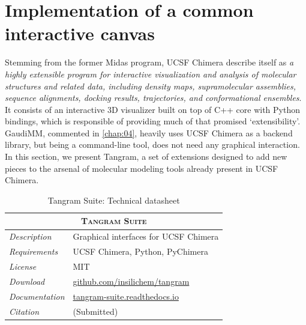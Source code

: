 \section{Implementation of a common interactive canvas}
Stemming from the former Midas program, UCSF Chimera describe itself as \textit{a highly extensible program for interactive visualization and analysis of molecular structures and related data, including density maps, supramolecular assemblies, sequence alignments, docking results, trajectories, and conformational ensembles}. It consists of an interactive 3D visualizer built on top of C++ core with Python bindings, which is responsible of providing much of that promised ‘extensibility’. GaudiMM, commented in \autoref{chap:04}, heavily uses UCSF Chimera as a backend library, but being a command-line tool, does not need any graphical interaction. In this section, we present Tangram, a set of extensions designed to add new pieces to the arsenal of molecular modeling tools already present in UCSF Chimera.


 \begin{table}[hbtp]
	\caption{Tangram Suite: Technical datasheet}
	\footnotesize
	\newcommand{\tableheading}[1]{\multicolumn{2}{c}{\textsc{#1}}}
	\begin{tabularx}{\textwidth}{RL}
		\toprule
		\tableheading{Tangram Suite}\\
		\toprule
		\textit{Description} & Graphical interfaces for UCSF Chimera\\
		\midrule
		\textit{Requirements} & UCSF Chimera, Python, PyChimera\\
		\midrule
		\textit{License} & MIT\\
		\midrule
		\textit{Download} & \href{https://github.com/insilichem/tangram}{github.com/insilichem/tangram} \\
		\midrule
		\textit{Documentation} & \href{http://tangram-suite.readthedocs.io}{tangram-suite.readthedocs.io} \\
		\midrule
		\textit{Citation} & (Submitted)\\
		\bottomrule

	\end{tabularx}
\end{table}




